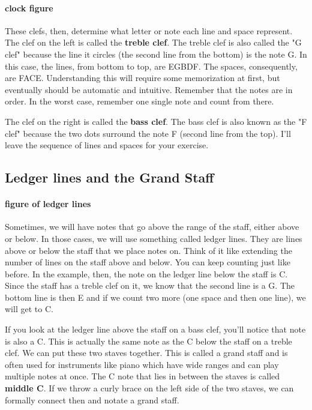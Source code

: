 \documentclass[../OpenAppliedMusicTheory.tex]{subfiles}
\begin{document}
        \paragraph{clock figure}

        These clefs, then, determine what letter or note each line and space represent. The clef on the left is called the \textbf{treble clef}. The treble clef is also called the "G clef" because the line it circles (the second line from the bottom) is the note G. In this case, the lines, from bottom to top, are EGBDF. The spaces, consequently, are FACE. Understanding this will require some memorization at first, but eventually should be automatic and intuitive. Remember that the notes are in order. In the worst case, remember one single note and count from there.

        The clef on the right is called the \textbf{bass clef}. The bass clef is also known as the "F clef" because the two dots surround the note F (second line from the top). I'll leave the sequence of lines and spaces for your exercise. 

        \subsection{Ledger lines and the Grand Staff}
        \paragraph{figure of ledger lines}

        Sometimes, we will have notes that go above the range of the staff, either above or below. In those cases, we will use something called ledger lines. They are lines above or below the staff that we place notes on. Think of it like extending the number of lines on the staff above and below. You can keep counting just like before. In the example, then, the note on the ledger line below the staff is C. Since the staff has a treble clef on it, we know that the second line is a G. The bottom line is then E and if we count two more (one space and then one line), we will get to C. 

        If you look at the ledger line above the staff on a bass clef, you'll notice that note is also a C. This is actually the same note as the C below the staff on a treble clef. We can put these two staves together. This is called a grand staff and is often used for instruments like piano which have wide ranges and can play multiple notes at once. The C note that lies in between the staves is called \textbf{middle C}. If we throw a curly brace on the left side of the two staves, we can formally connect then and notate a grand staff.
\end{document}
